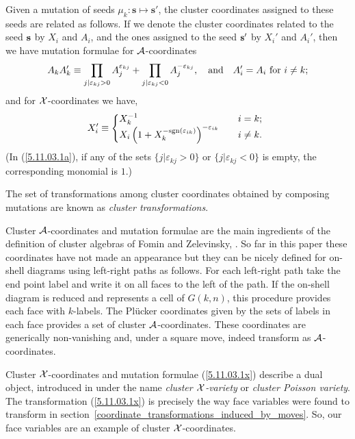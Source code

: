 \documentclass[12pt,hyperref,compress]{JHEP3}
\newcommand{\eq}[1]{\begin{equation}#1\end{equation}}
\begin{document}
Given a mutation of seeds $\mu_k:\mathbf{s}\!\mapsto\!\mathbf{s}'$, the cluster coordinates assigned to these seeds are related as follows. If we denote the cluster coordinates related to
the seed ${\bf s}$ by $X_i$ and $A_i$, and the ones assigned to the seed ${\bf s}'$ by $X_i'$ and $A_i'$, then we have mutation formulae for ${\cal A}$-coordinates
\vspace{-.2cm}\eq{A_{k}A'_{k}\equiv \prod_{j| \varepsilon_{kj} >0} A_{j}^{\varepsilon_{kj}} + \prod_{j| \varepsilon_{kj} <0} A_{j}^{-\varepsilon_{kj}},\quad\mathrm{and}\quad A'_{i} =  A_{i}\text{ for } i\neq k;\vspace{-.2cm}\label{5.11.03.1a}}
and for ${\cal X}$-coordinates we have,
\vspace{-.2cm}\eq{X'_{i}\equiv\left\{\begin{array}{@{}l@{$\qquad$}l} X_k^{-1}&i=k; \\ X_i\left(1+X_k^{-{\rm sgn} (\varepsilon_{ik})}\right)^{-\varepsilon_{ik}} & i\neq k.\end{array} \right.\label{5.11.03.1x}\vspace{-.2cm}}
(In (\ref{5.11.03.1a}), if any of the sets $\{j| \varepsilon_{kj} >0\}$ or $\{j| \varepsilon_{kj} < 0\}$ is empty, the corresponding monomial is $1$.)

The set of transformations among cluster coordinates obtained by composing mutations are known as {\it cluster transformations}.

Cluster ${\cal A}$-coordinates and mutation formulae are the main ingredients of the definition of cluster algebras of Fomin and Zelevinsky, \cite{FZ}. So far in this paper these coordinates have not made an appearance but they can be nicely defined for on-shell diagrams using left-right paths as follows. For each left-right path take the end point label and write it on all faces to the left of the path. If the on-shell diagram is reduced and represents a cell of $G(k,n)$, this procedure provides each face with $k$-labels. The Pl\"{u}cker coordinates given by the sets of labels in each face provides a set of cluster ${\cal A}$-coordinates. These coordinates are generically non-vanishing and, under a square move,  indeed transform as ${\cal A}$-coordinates.

Cluster ${\cal X}$-coordinates and mutation formulae (\ref{5.11.03.1x}) describe a dual object, introduced in \cite{FG2} under the name {\it cluster ${\cal X}$-variety} or {\it cluster Poisson variety}. The transformation (\ref{5.11.03.1x}) is precisely the way face variables were found to transform in \mbox{section \ref{coordinate_transformations_induced_by_moves}}.  So, our face variables are an example of cluster ${\cal X}$-coordinates.
\end{document}
